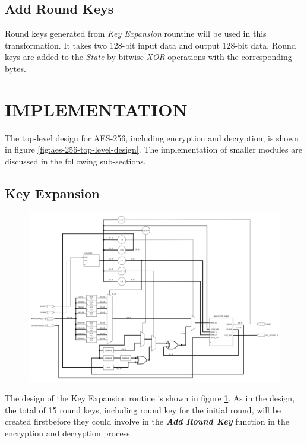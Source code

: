 \documentclass[a4paper, 10pt]{article}
\begin{document}
\begin{multicols}{2}
            \subsection{Add Round Keys}

            Round keys generated from \textit{Key Expansion} rountine will be used in this transformation. It takes two 128-bit input data and output 128-bit data. Round keys are added to the \textit{State} by bitwise \textit{XOR} operations with the corresponding bytes. 

        \section{IMPLEMENTATION}

	The top-level design for AES-256, including encryption and decryption, is shown in figure \ref{fig:aes-256-top-level-design}. The implementation of smaller modules are discussed in the following sub-sections.

          \subsection{Key Expansion}

	\noindent
            \begin{figure}[t]
                \centering
                \includegraphics[width=\linewidth]{KeyExpansion.png}
                \label{fig:KeyExpansion}
            \end{figure}

            The design of the Key Expansion routine is shown in figure \ref{fig:KeyExpansion}. As in the design, the total of 15 round keys, including round key for the initial round, will be created firstbefore they could involve in the \textbf{\textit{Add Round Key}} function in the encryption and decryption process.
            

\end{multicols}
\end{document}

